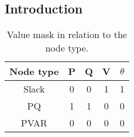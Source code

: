 \subsection*{Introduction}%
\label{subsec:Introduction}%
%
%
%
\newline%
\newline%
%
\newline%
\newline%


\begin{table}[h]%
    \centering%
    \begin{tabular}{|c|c|c|c|c|}%
        \hline%
        Node type & P & Q & V & $\theta$ \\%
        \hline%
        Slack     & 0 & 0 & 1 & 1        \\%
        \hline%
        PQ        & 1 & 1 & 0 & 0        \\%
        \hline%
        PVAR      & 0 & 0 & 0 & 0        \\%
        \hline%
    \end{tabular}%
    \caption{Value mask in relation to the node type.}%
    \label{tab:nodemasks}%
\end{table}

